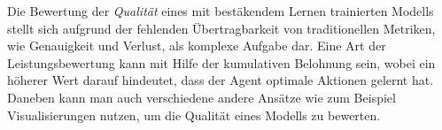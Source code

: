 Die Bewertung der \textit{Qualität} eines mit bestäkendem Lernen trainierten Modells stellt sich aufgrund der fehlenden Übertragbarkeit von traditionellen Metriken, wie Genauigkeit und Verlust, als komplexe Aufgabe dar. Eine Art der Leistungsbewertung kann mit Hilfe der kumulativen Belohnung sein, wobei ein höherer Wert darauf hindeutet, dass der Agent optimale Aktionen gelernt hat. Daneben kann man auch verschiedene andere Ansätze wie zum Beispiel Visualisierungen nutzen, um die Qualität eines Modells zu bewerten.